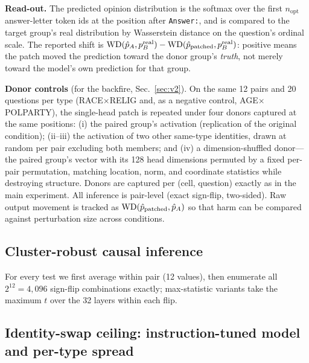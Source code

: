 \textbf{Read-out.} The predicted opinion distribution is the softmax over
the first $n_{\text{opt}}$ answer-letter token ids at the position after
\texttt{Answer:}, and is compared to the target group's real distribution
by Wasserstein distance on the question's ordinal scale. The reported
shift is
$\mathrm{WD}(\hat{p}_A, p^{\mathrm{real}}_B) - \mathrm{WD}(\hat{p}_{\text{patched}},
p^{\mathrm{real}}_B)$: positive means the patch moved the prediction
toward the donor group's \emph{truth}, not merely toward the model's own
prediction for that group.

\textbf{Donor controls} (for the \starhead{} backfire,
Sec.~\ref{sec:v2}). On the same 12 pairs and 20 questions per type
(RACE$\times$RELIG and, as a negative control, AGE$\times$POLPARTY), the
single-head patch is repeated under four donors captured at the same
positions: (i) the paired group's activation (replication of the original
condition); (ii--iii) the activation of two other same-type identities,
drawn at random per pair excluding both members; and (iv) a
dimension-shuffled donor---the paired group's vector with its 128 head
dimensions permuted by a fixed per-pair permutation, matching location,
norm, and coordinate statistics while destroying structure. Donors are
captured per (cell, question) exactly as in the main experiment. All
inference is pair-level (exact sign-flip, two-sided). Raw output movement
is tracked as $\mathrm{WD}(\hat{p}_{\text{patched}}, \hat{p}_A)$ so that
harm can be compared against perturbation size across conditions.

\subsection{Cluster-robust causal inference}
\label{app:cluster}
For every test we first average within pair (12 values), then enumerate
all $2^{12}=4{,}096$ sign-flip combinations exactly; max-statistic
variants take the maximum $t$ over the 32 layers within each flip.

\subsection{Identity-swap ceiling: instruction-tuned model and per-type spread}
\label{app:ceiling-instruct}
